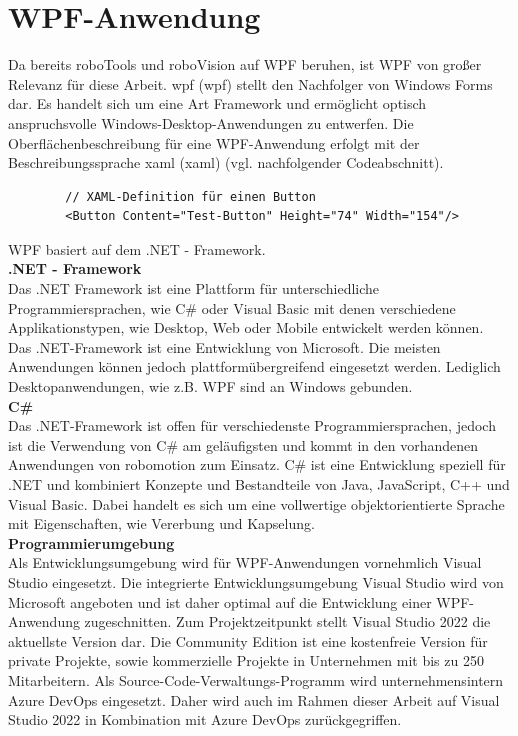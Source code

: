 \documentclass[ a4paper,
                oneside,
                toc=bibliography,
                toc=listof
                ]{scrbook}
\begin{document}
   	\section{WPF-Anwendung}
   	\label{sec:WPF}
   	Da bereits roboTools und roboVision auf WPF beruhen, ist WPF von großer Relevanz für diese Arbeit.
   	\ac{wpf} (\acl{wpf}) stellt den Nachfolger von Windows Forms dar. Es handelt sich um eine Art Framework und ermöglicht optisch anspruchsvolle Windows-Desktop-Anwendungen zu entwerfen. Die Oberflächenbeschreibung für eine WPF-Anwendung erfolgt mit der Beschreibungssprache \acs{xaml} (\acl{xaml}) (vgl. nachfolgender Codeabschnitt). \cite{kotz2022c}
   	\begin{lstlisting}
   		// XAML-Definition für einen Button
   		<Button Content="Test-Button" Height="74" Width="154"/>
   	\end{lstlisting}
   	WPF basiert auf dem .NET - Framework.\\
   	\textbf{.NET - Framework}\\
   	Das .NET Framework ist eine Plattform für unterschiedliche Programmiersprachen, wie C\# oder Visual Basic  mit denen verschiedene Applikationstypen, wie Desktop, Web oder Mobile entwickelt werden können.\\
   	Das .NET-Framework ist eine Entwicklung von Microsoft. Die meisten Anwendungen können jedoch plattformübergreifend eingesetzt werden. Lediglich Desktopanwendungen, wie z.B. WPF sind an Windows gebunden.  \cite{kotz2022c} \cite{troelsen2022pro}\\
   	\textbf{C\#}\\
   	Das .NET-Framework ist offen für verschiedenste Programmiersprachen, jedoch ist die Verwendung von C\# am geläufigsten und kommt in den vorhandenen Anwendungen von robomotion zum Einsatz. C\# ist eine Entwicklung speziell für .NET und kombiniert Konzepte und Bestandteile von Java, JavaScript, C++ und Visual Basic. Dabei handelt es sich um eine vollwertige objektorientierte Sprache mit Eigenschaften, wie Vererbung und Kapselung. \cite{kotz2022c} \cite{troelsen2022pro}\\
   	\textbf{Programmierumgebung}\\
   	Als Entwicklungsumgebung wird für WPF-Anwendungen vornehmlich Visual Studio eingesetzt. Die integrierte Entwicklungsumgebung Visual Studio wird von Microsoft angeboten und ist daher optimal auf die Entwicklung einer WPF-Anwendung zugeschnitten. Zum Projektzeitpunkt stellt Visual Studio 2022 die aktuellste Version dar. Die \glqq Community Edition\grqq{} ist eine kostenfreie Version für private Projekte, sowie kommerzielle Projekte in Unternehmen mit bis zu 250 Mitarbeitern. \cite{kotz2022c} Als Source-Code-Verwaltungs-Programm wird unternehmensintern \glqq Azure DevOps\grqq{} eingesetzt. Daher wird auch im Rahmen dieser Arbeit auf Visual Studio 2022 in Kombination mit Azure DevOps zurückgegriffen.\\
   	
\end{document}
